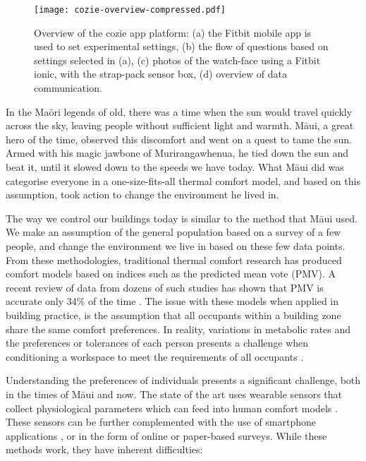 
\begin{figure}
\begin{center}
\texttt{[image: cozie-overview-compressed.pdf]}
\caption{Overview of the cozie app platform: (a) the Fitbit mobile app is used to set experimental settings, (b) the flow of questions based on settings selected in (a), (c) photos of the watch-face using a Fitbit ionic, with the strap-pack sensor box, (d) overview of data communication.}
\label{fig:homescreen}
\end{center}
\end{figure}

In the Ma\={o}ri legends of old, there was a time when the sun would travel quickly across the sky, leaving people without sufficient light and warmth. M\={a}ui, a great hero of the time, observed this discomfort and went on a quest to tame the sun. Armed with his magic jawbone of Murirangawhenua, he tied down the sun and beat it, until it slowed down to the speeds we have today. What M\={a}ui did was categorise everyone in a one-size-fits-all thermal comfort model, and based on this assumption, took action to change the environment he lived in. 

The way we control our buildings today is similar to the method that M\={a}ui used. We make an assumption of the general population based on a survey of a few people, and change the environment we live in based on these few data points. From these methodologies, traditional thermal comfort research has produced comfort models based on indices such as the predicted mean vote (PMV). A recent review of data from dozens of such studies has shown that PMV is accurate only 34\% of the time \cite{CHEUNG2019205}. The issue with these models when applied in building practice, is the assumption that all occupants within a building zone share the same comfort preferences. In reality, variations in metabolic rates and the preferences or tolerances of each person presents a challenge when conditioning a workspace to meet the requirements of all occupants \cite{kim2018personal}. %

Understanding the preferences of individuals presents a significant challenge, both in the times of M\={a}ui and now. The state of the art uses wearable sensors that collect physiological parameters which can feed into human comfort models \cite{liu2018personal}. These sensors can be further complemented with the use of smartphone applications \cite{barrios2017comfstat}, or in the form of online or paper-based surveys. While these methods work, they have inherent difficulties:

